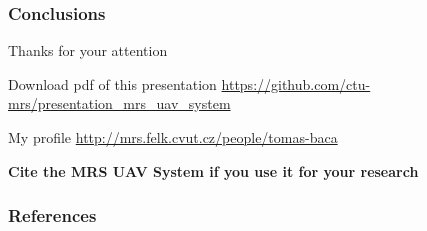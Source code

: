 \documentclass[aspectratio=169,9pt]{beamer}
\begin{document}


\begin{frame}
  \frametitle{Conclusions}

  \begin{center}
    \huge Thanks for your attention\\
  \end{center}

  \begin{block}{Download pdf of this presentation}
    \centering
    \Large\url{https://github.com/ctu-mrs/presentation_mrs_uav_system}
  \end{block}

  \begin{block}{My profile}
    \centering
    \Large\url{http://mrs.felk.cvut.cz/people/tomas-baca}
  \end{block}

  \begin{block}{\centering \textbf{Cite the MRS UAV System if you use it for your research}}
    \small {}
  \end{block}

\end{frame}



\DeclareCiteCommand{\fullcite}
{}
{%
  \usedriver
  {%
  }
{}}
{\multicitedelim}
{}

\begin{frame}[allowframebreaks]
  \frametitle{References}
  \tiny{
    \printbibliography[heading=none,title={}]
  }
\end{frame}

\end{document}
